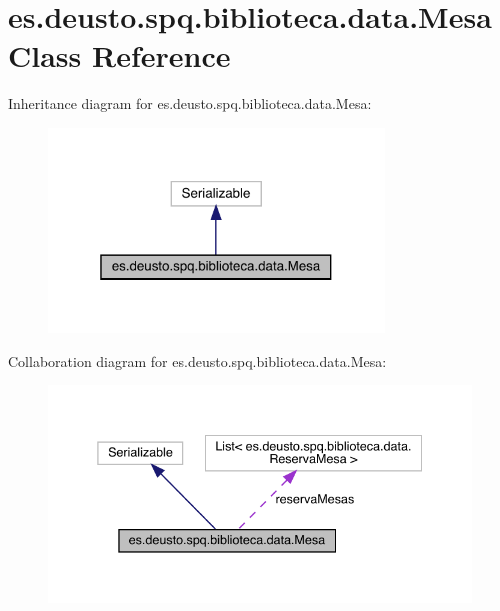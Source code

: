 \hypertarget{classes_1_1deusto_1_1spq_1_1biblioteca_1_1data_1_1_mesa}{}\section{es.\+deusto.\+spq.\+biblioteca.\+data.\+Mesa Class Reference}
\label{classes_1_1deusto_1_1spq_1_1biblioteca_1_1data_1_1_mesa}


Inheritance diagram for es.\+deusto.\+spq.\+biblioteca.\+data.\+Mesa\+:
\nopagebreak
\begin{figure}[H]
\begin{center}
\leavevmode
\includegraphics[width=253pt]{classes_1_1deusto_1_1spq_1_1biblioteca_1_1data_1_1_mesa__inherit__graph}
\end{center}
\end{figure}


Collaboration diagram for es.\+deusto.\+spq.\+biblioteca.\+data.\+Mesa\+:
\nopagebreak
\begin{figure}[H]
\begin{center}
\leavevmode
\includegraphics[width=338pt]{classes_1_1deusto_1_1spq_1_1biblioteca_1_1data_1_1_mesa__coll__graph}
\end{center}
\end{figure}
